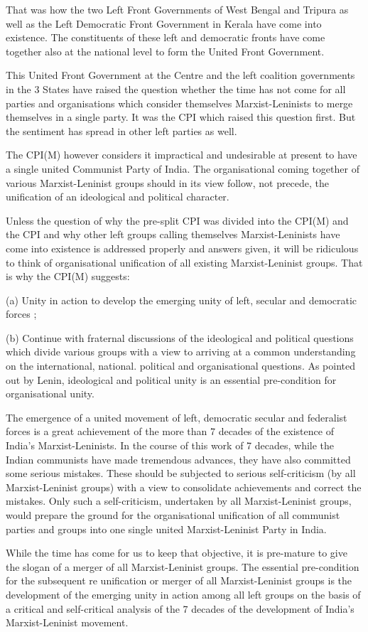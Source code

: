 That was how the two Left Front Governments of West Bengal and Tripura as well as the Left Democratic Front Government in Kerala have come into existence. The constituents of these left and democratic fronts have come together also at the national level to form the United Front 
Government. 

This United Front Government at the Centre and the left coalition governments in the 3 States have raised the question whether the time has not come for all parties and organisations which consider themselves Marxist-Leninists to merge themselves in a single party. It was the CPI which raised this question first. But the sentiment has spread in other left parties as well. 

The CPI(M) however considers it impractical and undesirable at present to have a single united Communist Party of India. The organisational coming together of various Marxist-Leninist groups should in its view follow, not precede, the unification of an ideological and political character. 

Unless the question of why the pre-split CPI was divided into the CPI(M) and the CPI and why other left groups calling themselves Marxist-Leninists have come into existence is addressed properly and answers given, it will be ridiculous to think of organisational unification of all existing Marxist-Leninist groups. That is why the CPI(M) suggests: 

(a) Unity in action to develop the emerging unity of left, 
secular and democratic forces ; 

(b) Continue with fraternal discussions of the ideological and political questions which divide various groups with a view to arriving at a common understanding on the international, national. political and organisational questions. As pointed out by Lenin, ideological and political unity is an essential pre-condition for organisational unity. 

The emergence of a united movement of left, democratic secular and federalist forces is a great achievement of the more than 7 decades of the existence of India’s Marxist-Leninists. In the course of this work of 7 decades, while the Indian communists have made tremendous advances, they have also committed some serious mistakes. These should be subjected to serious self-criticism (by all Marxist-Leninist groups) with a view to consolidate achievements and correct the mistakes. Only such a self-criticism, undertaken by all Marxist-Leninist groups, would prepare the ground for the organisational unification of all communist parties and groups into one single united Marxist-Leninist Party in India.

While the time has come for us to keep that objective, it is pre-mature to give the slogan of a merger of all Marxist-Leninist groups. The essential pre-condition for the subsequent re unification or merger of all Marxist-Leninist groups is the development of the emerging unity in action among all left groups on the basis of a critical and self-critical analysis of the 7 decades of the development of India's Marxist-Leninist movement.
